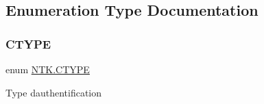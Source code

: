 \subsection{Enumeration Type Documentation}
\mbox{\label{namespace_n_t_k_a8fa28c7c4270bbb81ee96b4f632fdbec}} 
\subsubsection{\texorpdfstring{CTYPE}{CTYPE}}
{\footnotesize\ttfamily enum \mbox{\hyperlink{namespace_n_t_k_a8fa28c7c4270bbb81ee96b4f632fdbec}{N\+T\+K.\+C\+T\+Y\+PE}}\hspace{0.3cm}{\ttfamily [strong]}}



Type d\textquotesingle{}authentification 

